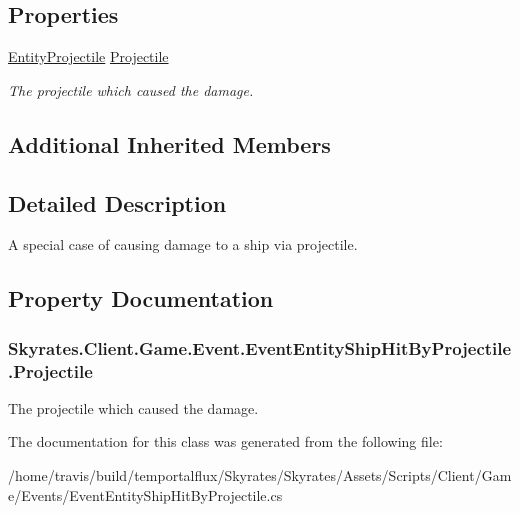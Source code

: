 \subsection*{Properties}
\begin{DoxyCompactItemize}
\item 
\hyperlink{class_skyrates_1_1_client_1_1_entity_1_1_entity_projectile}{Entity\-Projectile} \hyperlink{class_skyrates_1_1_client_1_1_game_1_1_event_1_1_event_entity_ship_hit_by_projectile_a278251a91678e0e27991998354e16455}{Projectile}
\begin{DoxyCompactList}\small\item\em The projectile which caused the damage. \end{DoxyCompactList}\end{DoxyCompactItemize}
\subsection*{Additional Inherited Members}


\subsection{Detailed Description}
A special case of causing damage to a ship via projectile. 



\subsection{Property Documentation}
\hypertarget{class_skyrates_1_1_client_1_1_game_1_1_event_1_1_event_entity_ship_hit_by_projectile_a278251a91678e0e27991998354e16455}{
\subsubsection[{Projectile}]{ Skyrates.\-Client.\-Game.\-Event.\-Event\-Entity\-Ship\-Hit\-By\-Projectile.\-Projectile\hspace{0.3cm}{\ttfamily [get]}}}\label{class_skyrates_1_1_client_1_1_game_1_1_event_1_1_event_entity_ship_hit_by_projectile_a278251a91678e0e27991998354e16455}


The projectile which caused the damage. 



The documentation for this class was generated from the following file\-:\begin{DoxyCompactItemize}
\item 
/home/travis/build/temportalflux/\-Skyrates/\-Skyrates/\-Assets/\-Scripts/\-Client/\-Game/\-Events/Event\-Entity\-Ship\-Hit\-By\-Projectile.\-cs\end{DoxyCompactItemize}
